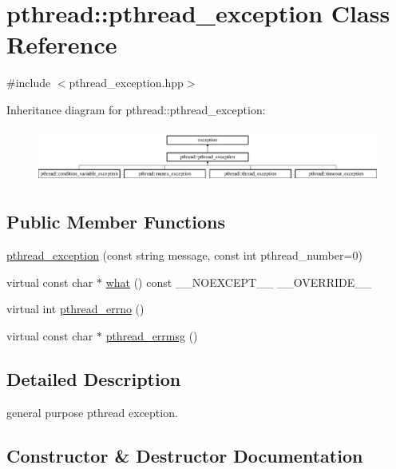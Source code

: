 \hypertarget{classpthread_1_1pthread__exception}{}\section{pthread\+:\+:pthread\+\_\+exception Class Reference}
\label{classpthread_1_1pthread__exception}


{\ttfamily \#include $<$pthread\+\_\+exception.\+hpp$>$}

Inheritance diagram for pthread\+:\+:pthread\+\_\+exception\+:\begin{figure}[H]
\begin{center}
\leavevmode
\includegraphics[height=1.794872cm]{classpthread_1_1pthread__exception}
\end{center}
\end{figure}
\subsection*{Public Member Functions}
\begin{DoxyCompactItemize}
\item 
\hyperlink{classpthread_1_1pthread__exception_ab7204244a70e74c239b284d9b9fad91c}{pthread\+\_\+exception} (const string message, const int pthread\+\_\+number=0)
\item 
virtual const char $\ast$ \hyperlink{classpthread_1_1pthread__exception_a6a4ff68b095f2e0ddb646b75af790c73}{what} () const \+\_\+\+\_\+\+N\+O\+E\+X\+C\+E\+P\+T\+\_\+\+\_\+ \+\_\+\+\_\+\+O\+V\+E\+R\+R\+I\+D\+E\+\_\+\+\_\+
\item 
virtual int \hyperlink{classpthread_1_1pthread__exception_a8a5c22a403ebd14635e912295fe02a1e}{pthread\+\_\+errno} ()
\item 
virtual const char $\ast$ \hyperlink{classpthread_1_1pthread__exception_aa2371eb23800817723174186450e9716}{pthread\+\_\+errmsg} ()
\end{DoxyCompactItemize}


\subsection{Detailed Description}
general purpose pthread exception. 

\subsection{Constructor \& Destructor Documentation}
